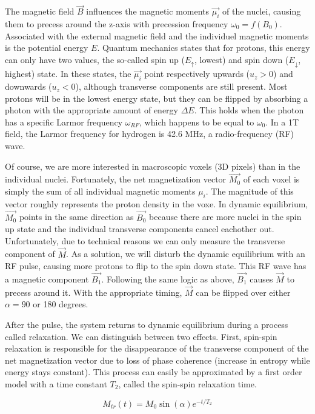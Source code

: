The magnetic field $\vec{B}$ influences the magnetic moments $\vec{\mu_i}$ of
the nuclei, causing them to precess around the z-axis with precession frequency
$\omega_0 = f(B_0)$. Associated with the external magnetic field and the
individuel magnetic moments is the potential energy $E$. Quantum mechanics
states that for protons, this energy can only have two values, the so-called
spin up ($E_\uparrow$, lowest) and spin down ($E_\downarrow$, highest) state. In
these states, the $\vec{\mu_i}$ point respectively upwards ($u_z > 0$) and
downwards ($u_z < 0$), although transverse components are still present. Most
protons will be in the lowest energy state, but they can be flipped by
absorbing a photon with the appropriate amount of energy $\Delta E$. This holds
when the photon has a specific Larmor frequency $\omega_{RF}$, which happens to
be equal to $\omega_0$. In a 1T field, the Larmor frequency for hydrogen is
42.6 MHz, a radio-frequency (RF) wave.

Of course, we are more interested in macroscopic voxels (3D pixels) than in the
individual nuclei. Fortunately, the net magnetization vector $\vec{M_0}$ of each
voxel is simply the sum of all individual magnetic moments $\mu_i$. The
magnitude of this vector roughly represents the proton density in the voxe. In
dynamic equilibrium, $\vec{M_0}$ points in the same direction as $\vec{B_0}$
because there are more nuclei in the spin up state and the individual transverse
components cancel eachother out. Unfortunately, due to technical reasons we can only
measure the transverse component of $\vec{M}$. As a solution, we will disturb
the dynamic equilibrium with an RF pulse, causing more protons to flip to the
spin down state. This RF wave has a magnetic component $\vec{B_1}$. Following
the same logic as above, $\vec{B_1}$ causes $\vec{M}$ to precess around it. With
the appropriate timing, $\vec{M}$ can be flipped over either $\alpha=90$ or 180
degrees.

After the pulse, the system returns to dynamic equilibrium during a process
called relaxation. We can distinguish between two effects. First, spin-spin
relaxation is responsible for the disappearance of the transverse component of
the net magnetization vector due to loss of phase coherence (increase in
entropy while energy stays constant). This process can easily be approximated
by a first order model with a time constant $T_2$, called the spin-spin
relaxation time.

\begin{equation}
M_{tr}(t) = M_0 \sin(\alpha) e^{-t/T_2}
\end{equation}

